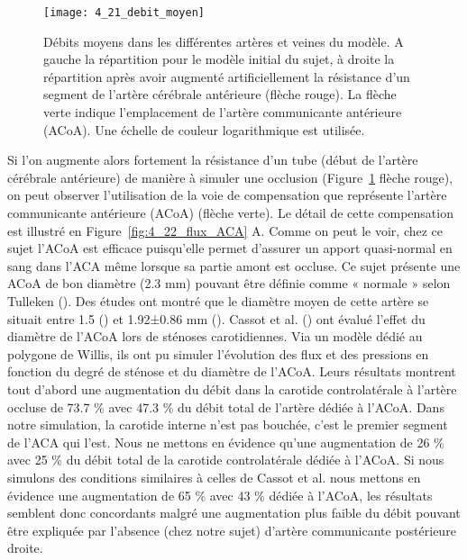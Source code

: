 \begin{figure}[!b]
\centering
\texttt{[image: 4\_21\_debit\_moyen]}
\caption{Débits moyens dans les différentes artères et veines du modèle. A gauche la répartition pour le modèle initial du
sujet, à droite la répartition après avoir augmenté artificiellement la résistance d’un segment de l’artère cérébrale
antérieure (flèche rouge). La flèche verte indique l’emplacement de l’artère communicante antérieure (ACoA). Une échelle
de couleur logarithmique est utilisée.}
\label{fig:4_21_debit_moyen}	
\end{figure}
Si l’on augmente alors fortement la résistance d’un tube (début de l’artère cérébrale
antérieure) de manière à simuler une occlusion (Figure~\ref{fig:4_21_debit_moyen} flèche rouge), on peut observer l’utilisation
de la voie de compensation que représente l’artère communicante antérieure (ACoA) (flèche verte).
Le détail de cette compensation est illustré en Figure~\ref{fig:4_22_flux_ACA} A. Comme on peut le voir, chez ce sujet l’ACoA
est efficace puisqu’elle permet d’assurer un apport quasi-normal en sang dans l’ACA même lorsque sa
partie amont est occluse. Ce sujet présente une ACoA de bon diamètre (2.3 mm) pouvant être définie
comme « normale » selon Tulleken (\cite{Tulleken1978}). Des études ont montré que le diamètre moyen de cette
artère se situait entre 1.5 (\cite{Perlmutter1976}) et 1.92±0.86 mm (\cite{Hillen1986}). Cassot et al. (\cite{Cassot1995}) ont évalué l’effet du diamètre
de l’ACoA lors de sténoses carotidiennes. Via un modèle dédié au polygone de Willis, ils ont pu simuler
l’évolution des flux et des pressions en fonction du degré de sténose et du diamètre de l’ACoA. Leurs
résultats montrent tout d’abord une augmentation du débit dans la carotide controlatérale à l’artère
occluse de 73.7 \% avec 47.3 \% du débit total de l’artère dédiée à l’ACoA. Dans notre simulation, la
carotide interne n’est pas bouchée, c’est le premier segment de l’ACA qui l’est. Nous ne mettons en
évidence qu’une augmentation de 26 \% avec 25 \% du débit total de la carotide controlatérale dédiée
à l’ACoA. Si nous simulons des conditions similaires à celles de Cassot et al. nous mettons en évidence
une augmentation de 65 \% avec 43 \% dédiée à l’ACoA, les résultats semblent donc concordants malgré
une augmentation plus faible du débit pouvant être expliquée par l’absence (chez notre sujet) d’artère
communicante postérieure droite.

